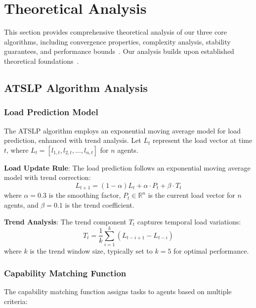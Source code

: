 \documentclass[conference]{IEEEtran}
\begin{document}
\section{Theoretical Analysis}

This section provides comprehensive theoretical analysis of our three core algorithms, including convergence properties, complexity analysis, stability guarantees, and performance bounds~\cite{sutton2018reinforcement,vaswani2017attention,cormen2009introduction}. Our analysis builds upon established theoretical foundations~\cite{skiena2008algorithm,sedgewick2011algorithms}.

\subsection{ATSLP Algorithm Analysis}

\subsubsection{Load Prediction Model}

The ATSLP algorithm employs an exponential moving average model for load prediction, enhanced with trend analysis. Let $L_t$ represent the load vector at time $t$, where $L_t = [l_{1,t}, l_{2,t}, \ldots, l_{n,t}]$ for $n$ agents.

\textbf{Load Update Rule}: The load prediction follows an exponential moving average model with trend correction:
\begin{equation}
L_{t+1} = (1-\alpha)L_t + \alpha \cdot P_t + \beta \cdot T_t
\end{equation}
where $\alpha = 0.3$ is the smoothing factor, $P_t \in \mathbb{R}^n$ is the current load vector for $n$ agents, and $\beta = 0.1$ is the trend coefficient.

\textbf{Trend Analysis}: The trend component $T_t$ captures temporal load variations:
\begin{equation}
T_t = \frac{1}{k}\sum_{i=1}^{k} (L_{t-i+1} - L_{t-i})
\end{equation}
where $k$ is the trend window size, typically set to $k = 5$ for optimal performance.

\subsubsection{Capability Matching Function}

The capability matching function assigns tasks to agents based on multiple criteria:
\end{document}
